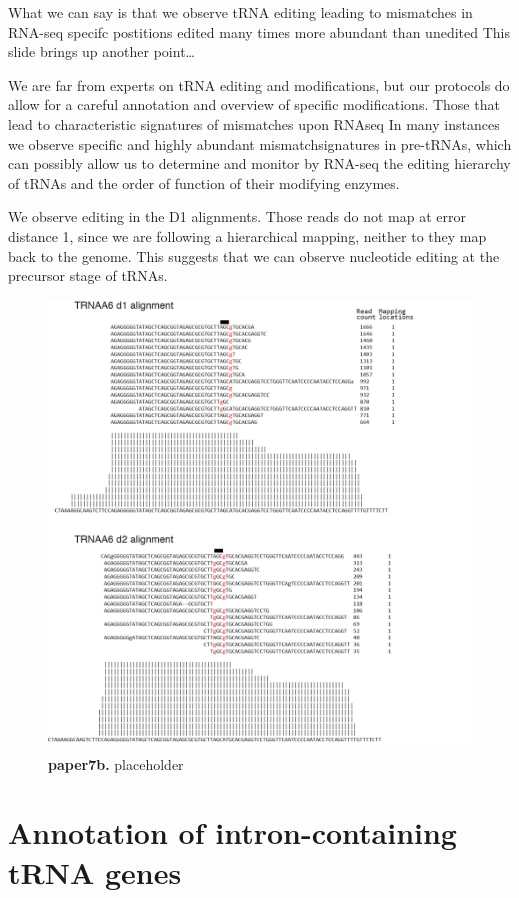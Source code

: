 \documentclass[12pt]{rockefeller}
\begin{document}
What we can say is that 
	we observe tRNA editing leading to mismatches in RNA-seq
	specifc postitions 
	edited many times more abundant than unedited
This slide brings up another point…

We are far from experts on tRNA editing and modifications, but our protocols do allow for a careful annotation and overview of specific modifications. Those that lead to characteristic signatures of mismatches upon RNAseq
In many instances we observe specific and highly abundant mismatchsignatures in pre-tRNAs, which can possibly allow us to determine and monitor by RNA-seq the editing hierarchy of tRNAs and the order of function of their modifying enzymes. 

We observe editing in the D1 alignments. Those reads do not map at error distance 1, since we are following a hierarchical mapping, neither to they map back to the genome. This suggests that we can observe nucleotide editing at the precursor stage of tRNAs. 

\begin{figure}[!ht]%
\centering
\includegraphics[width = 5in]{paper7b.png}%
\caption[paper7b]
{\textbf{paper7b.}
placeholder}
\centering
\label{paper7b}%
\end{figure}

\section{Annotation of intron-containing tRNA genes} \label{introns}
\end{document}
